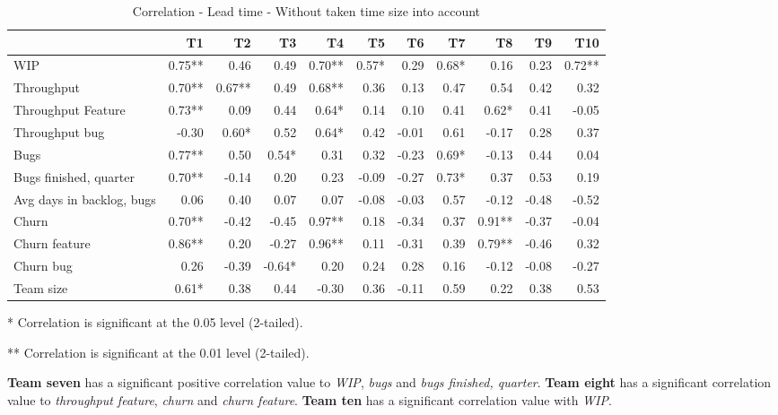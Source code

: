 \documentclass[UKenglish]{ifimaster}  %
\begin{document}
\begin{minipage}[t]{\linewidth}
\begin{table}[H]
 \begin{adjustwidth}{-1.5cm}{}
 \centering
 \begin{tabular}{|l|r|r|r|r|r|r|r|r|r|r|}
\hline
 & \bf{T1} & \bf{T2} & \bf{T3} & \bf{T4} & \bf{T5} & \bf{T6} & \bf{T7} & \bf{T8} & \bf{T9} & \bf{T10}\\ \hline
 WIP  & 0.75** & 0.46 & 0.49 & 0.70** & 0.57* & 0.29 & 0.68* & 0.16 & 0.23 & 0.72** \\ \hline
 Throughput  & 0.70** & 0.67** & 0.49 & 0.68** & 0.36 & 0.13 & 0.47 & 0.54 & 0.42 & 0.32 \\ \hline
 Throughput Feature  & 0.73** & 0.09 & 0.44 & 0.64* & 0.14 & 0.10 & 0.41 & 0.62* & 0.41 & -0.05 \\ \hline
 Throughput bug  & -0.30 & 0.60* & 0.52 & 0.64* & 0.42 & -0.01 & 0.61 & -0.17 & 0.28 & 0.37 \\ \hline
 Bugs  & 0.77** & 0.50 & 0.54* & 0.31 & 0.32 & -0.23 & 0.69* & -0.13 & 0.44 & 0.04 \\ \hline
 Bugs finished, quarter  & 0.70** & -0.14 & 0.20 & 0.23 & -0.09 & -0.27 & 0.73* & 0.37 & 0.53 & 0.19 \\ \hline
 Avg days in backlog, bugs  & 0.06 & 0.40 & 0.07 & 0.07 & -0.08 & -0.03 & 0.57 & -0.12 & -0.48 & -0.52 \\ \hline
 Churn  & 0.70** & -0.42 & -0.45 & 0.97** & 0.18 & -0.34 & 0.37 & 0.91** & -0.37 & -0.04 \\ \hline
 Churn feature  & 0.86** & 0.20 & -0.27 & 0.96** & 0.11 & -0.31 & 0.39 & 0.79** & -0.46 & 0.32 \\ \hline
 Churn bug  & 0.26 & -0.39 & -0.64* & 0.20 & 0.24 & 0.28 & 0.16 & -0.12 & -0.08 & -0.27 \\ \hline
 Team size  & 0.61* & 0.38 & 0.44 & -0.30 & 0.36 & -0.11 & 0.59 & 0.22 & 0.38 & 0.53 \\ \hline
\end{tabular}
 \caption{Correlation - Lead time - Without taken time size into account}
 \label{corr:lt}
 \centerline {* Correlation is significant at the 0.05 level (2-tailed).}
\centerline{** Correlation is significant at the 0.01 level (2-tailed).}
\end{adjustwidth}
\end{table}
\end{minipage}

\textbf{Team seven} has a significant positive correlation value to \textit{WIP}, \textit{bugs} and \textit{bugs finished, quarter}. \textbf{Team eight} has a significant correlation value to \textit{throughput feature}, \textit{churn} and \textit{churn feature}. \textbf{Team ten} has a significant correlation value with \textit{WIP}.
\end{document}
